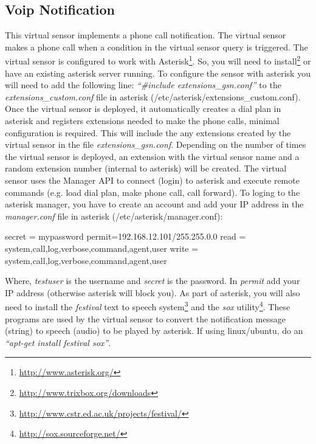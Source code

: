 \subsection{Voip Notification \vs \label{voip:vsp}}

This virtual sensor implements a phone call notification. The virtual sensor makes a phone call when a condition 
in the virtual sensor query is triggered. The virtual sensor is configured to work with Asterisk\footnote{\url{http://www.asterisk.org/}}. So, you will need to install\footnote{\url{http://www.trixbox.org/downloads}} or have an existing asterisk server running. To configure the sensor with asterisk you will need to add the following line: \textit{``\#include extensions\_gsn.conf''} to the \textit{extensions\_custom.conf} file in asterisk (/etc/asterisk/extensions\_custom.conf). Once the virtual sensor is deployed, it automatically creates a dial plan in asterisk and registers extensions needed to make the phone calls, minimal configuration is required.
This will include the any extensions created by the virtual sensor in the file \textit{extensions\_gsn.conf}. Depending on the number of times the virtual sensor is deployed, an extension with the virtual sensor name and a random extension number (internal to asterisk) will be created.
The virtual sensor uses the Manager API to connect (login) to asterisk and execute remote commands (e.g. load dial plan, make phone call, call forward). To loging to the asterisk manager, you have to create an account and add your IP address in the \textit{manager.conf} file in asterisk (/etc/asterisk/manager.conf):

\begin{bashcode}[caption={Settings for Manager.conf file in Asterisk}, label=listing:bash:voip_vsd]
[testuser]
secret = mypassword
permit=192.168.12.101/255.255.0.0
read = system,call,log,verbose,command,agent,user
write = system,call,log,verbose,command,agent,user
\end{bashcode}

Where, \textit{testuser} is the username and \textit{secret} is the password. In \textit{permit} add your IP address (otherwise asterisk will block you). As part of asterisk, you will also need to install the \textit{festival} text to speech system\footnote{\url{http://www.cstr.ed.ac.uk/projects/festival/}} and the \textit{sox} utility\footnote{\url{http://sox.sourceforge.net/}}. These programs are used by the virtual sensor to convert the notification message (string) to speech (audio) to be played by asterisk. If using linux/ubuntu, do an  \textit{``apt-get install festival sox''}.

